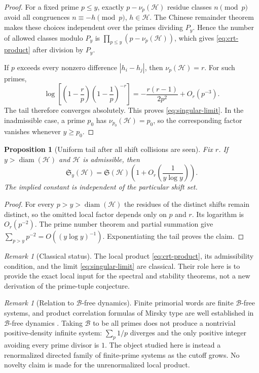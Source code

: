 \documentclass[11pt]{article}
\newtheorem{proposition}[theorem]{Proposition}
\theoremstyle{definition}
\theoremstyle{remark}
\newtheorem{remark}[theorem]{Remark}
\newcommand{\cH}{\mathcal H}
\newcommand{\diam}{\operatorname{diam}}
\begin{document}
\begin{proof}
For a fixed prime $p\le y$, exactly $p-\nu_p(\cH)$ residue classes $n\pmod p$ avoid all congruences $n\equiv-h\pmod p$, $h\in\cH$.  The Chinese remainder theorem makes these choices independent over the primes dividing $P_y$.  Hence the number of allowed classes modulo $P_y$ is
$\prod_{p\le y}(p-\nu_p(\cH))$, which gives \eqref{eq:crt-product} after division by $P_y$.

If $p$ exceeds every nonzero difference $|h_i-h_j|$, then $\nu_p(\cH)=r$.  For such primes,
\[
 \log\left[\left(1-\frac rp\right)
             \left(1-\frac1p\right)^{-r}\right]
 =-\frac{r(r-1)}{2p^2}+O_r(p^{-3}).
\]
The tail therefore converges absolutely.  This proves \eqref{eq:singular-limit}.  In the inadmissible case, a prime $p_0$ has $\nu_{p_0}(\cH)=p_0$, so the corresponding factor vanishes whenever $y\ge p_0$.
\end{proof}

\begin{proposition}[Uniform tail after all shift collisions are seen]\label{prop:uniform-tail}
Fix $r$.  If $y>\diam(\cH)$ and $\cH$ is admissible, then
\begin{equation}\label{eq:uniform-tail}
    \mathfrak S_y(\cH)
    =\mathfrak S(\cH)
      \left(1+O_r\left(\frac1{y\log y}\right)\right).
\end{equation}
The implied constant is independent of the particular shift set.
\end{proposition}

\begin{proof}
For every $p>y>\diam(\cH)$ the residues of the distinct shifts remain distinct, so the omitted local factor depends only on $p$ and $r$.  Its logarithm is $O_r(p^{-2})$.  The prime number theorem and partial summation give
$\sum_{p>y}p^{-2}=O((y\log y)^{-1})$.  Exponentiating the tail proves the claim.
\end{proof}

\begin{remark}[Classical status]\label{rem:classical}
The local product \eqref{eq:crt-product}, its admissibility condition, and the limit \eqref{eq:singular-limit} are classical.  Their role here is to provide the exact local input for the spectral and stability theorems, not a new derivation of the prime-tuple conjecture.
\end{remark}

\begin{remark}[Relation to $\mathcal B$-free dynamics]\label{rem:b-free}
Finite primorial words are finite $\mathcal B$-free systems, and product correlation formulas of Mirsky type are well established in $\mathcal B$-free dynamics \citep{ElAbdalaouiLemanczykDeLaRue2015,KasjanKellerLemanczyk2019}.  Taking $\mathcal B$ to be all primes does not produce a nontrivial positive-density infinite system: $\sum_p1/p$ diverges and the only positive integer avoiding every prime divisor is $1$.  The object studied here is instead a renormalized directed family of finite-prime systems as the cutoff grows.  No novelty claim is made for the unrenormalized local product.
\end{remark}
\end{document}
